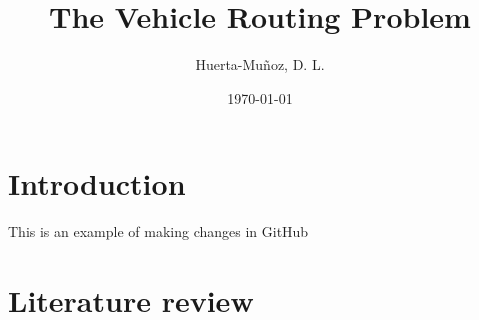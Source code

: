 \documentclass{article}
\title{The Vehicle Routing Problem}
\author{Huerta-Muñoz, D. L.}
\date{\today}
\begin{document}
\maketitle

\section{Introduction}

This is an example of making changes in GitHub

\section{Literature review}
\end{document}
